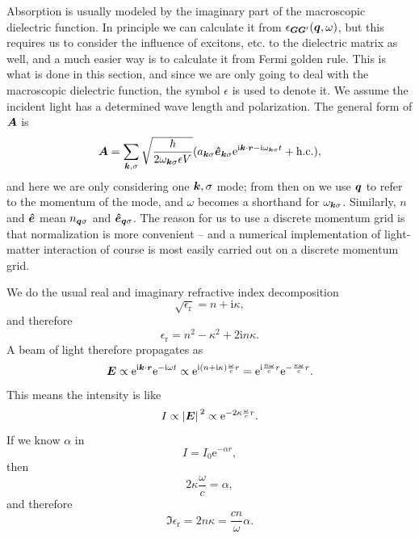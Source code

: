 \documentclass[hyperref, a4paper, 12pt]{report}
\newcommand*{\ii}{\mathrm{i}}
\newcommand*{\ee}{\mathrm{e}}
\newcommand*{\epsr}{\epsilon_{\text{r}}}
\begin{document}
Absorption is usually modeled by the imaginary part of the macroscopic dielectric function.
In principle we can calculate it from $\epsilon_{\vb*{G} \vb*{G}'}(\vb*{q}, \omega)$, 
but this requires us to consider the influence of excitons, etc. to the dielectric matrix as well,
and a much easier way is to calculate it from Fermi golden rule.
This is what is done in this section, 
and since we are only going to deal with the macroscopic dielectric function, 
the symbol $\epsilon$ is used to denote it. 
We assume the incident light 
has a determined wave length and polarization.
The general form of $\vb*{A}$ is 
\begin{equation}
    \vb*{A} = \sum_{\vb*{k}, \sigma}
        \sqrt{\frac{\hbar}{2 \omega_{\vb*{k} \sigma} \epsilon V}}
        (
            a_{\vb*{k} \sigma} \vu*{e}_{\vb*{k} \sigma} 
            \ee^{\ii \vb*{k} \cdot \vb*{r} - \ii \omega_{\vb*{k} \sigma} t}
            + \text{h.c.}
        ),
    \label{eq:a-and-photon}
\end{equation}
and here we are only considering one $\vb*{k}, \sigma$ mode; 
from then on we use $\vb*{q}$ to refer to the momentum of the mode,
and $\omega$ becomes a shorthand for $\omega_{\vb*{k} \sigma}$.
Similarly, $n$ and $\vu*{e}$ mean 
$n_{\vb*{q} \sigma}$ and $\vu*{e}_{\vb*{q} \sigma}$.
The reason for us to use a discrete momentum grid 
is that normalization is more convenient -- 
and a numerical implementation of light-matter interaction
of course is most easily carried out 
on a discrete momentum grid.

We do the usual real and imaginary refractive index decomposition
\begin{equation}
    \sqrt{\epsr} = n + \ii \kappa,
\end{equation}
and therefore 
\begin{equation}
    \epsr = n^2 - \kappa^2 + 2 \ii n \kappa .
\end{equation}
A beam of light therefore propagates as 
\begin{equation}
    \vb*{E} \propto \ee^{\ii \vb*{k} \cdot \vb*{r}} \ee^{- \ii \omega t}
    \propto \ee^{\ii (n + \ii \kappa) \frac{\omega}{c} r} 
    = \ee^{\ii \frac{n \omega}{c} r} \ee^{- \frac{\kappa \omega}{c} r}.
    \label{eq:light-propagating}
\end{equation}
This means the intensity is like 
\[
    I \propto \abs*{\vb*{E}}^2 \propto \ee^{- 2 \kappa \frac{\omega}{c} r}.
\]
If we know $\alpha$  in
\begin{equation}
    I = I_0 \ee^{- \alpha r}, 
    \label{eq:light-matter.decay}
\end{equation}
then 
\[
    2 \kappa \frac{\omega}{c} = \alpha,
\]
and therefore 
\begin{equation}
    \Im \epsr = 2 n \kappa = \frac{c n}{\omega} \alpha.
    \label{eq:imaginary-epsilon-alpha}
\end{equation}
\end{document}
